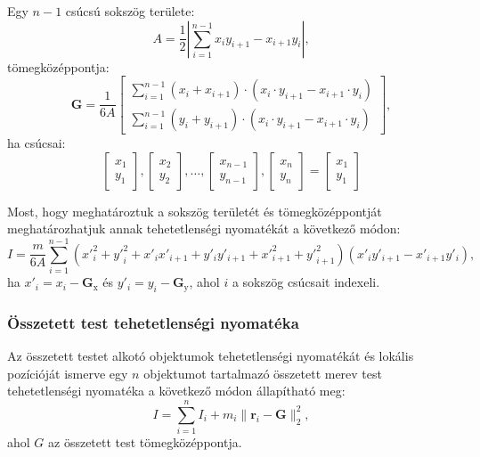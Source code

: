 \documentclass[12pt]{report}
\begin{document}
Egy $n - 1$ csúcsú sokszög területe:
\[
    A = \frac{1}{2} \left|\sum_{i = 1}^{n - 1} x_i y_{i + 1} - x_{i + 1} y_i\right|, \tag{1} \label{eq:shoelace}
\]
tömegközéppontja:
\[
    \mathbf{G} = \frac{1}{6A}
    \begin{bmatrix}
        \sum_{i = 1}^{n - 1} (x_i + x_{i + 1}) \cdot (x_i \cdot y_{i + 1} - x_{i + 1} \cdot y_i) \\
        \sum_{i = 1}^{n - 1} (y_i + y_{i + 1}) \cdot (x_i \cdot y_{i + 1} - x_{i + 1} \cdot y_i)
    \end{bmatrix},
\]
ha csúcsai:
\[
    \begin{bmatrix}
        x_1 \\
        y_1
    \end{bmatrix},
    \begin{bmatrix}
        x_2 \\
        y_2
    \end{bmatrix},
    \dots,
    \begin{bmatrix}
        x_{n - 1} \\
        y_{n - 1}
    \end{bmatrix},
    \begin{bmatrix}
        x_n \\
        y_n
    \end{bmatrix}=
    \begin{bmatrix}
        x_1 \\
        y_1
    \end{bmatrix}
\]

Most, hogy meghatároztuk a sokszög területét és tömegközéppontját meghatározhatjuk annak tehetetlenségi nyomatékát a következő módon:
\[
    I = \frac{m}{6A} \sum_{i = 1}^{n - 1} ({x'}_i^2 + {y'}_i^2 + x'_i x'_{i + 1} + y'_i y'_{i + 1} + {x'}_{i + 1}^2 + {y'}_{i + 1}^2)(x'_i y'_{i + 1} - x'_{i + 1} y'_i),
\]
ha $x'_i = x_i - \mathbf{G}_{\text{x}}$ és $y'_i = y_i - \mathbf{G}_{\text{y}}$, ahol $i$ a sokszög csúcsait indexeli.

\subsubsection{Összetett test tehetetlenségi nyomatéka}

Az összetett testet alkotó objektumok tehetetlenségi nyomatékát és lokális pozícióját ismerve egy $n$ objektumot tartalmazó összetett merev test tehetetlenségi nyomatéka a következő módon állapítható meg:
\[
    I = \sum_{i = 1}^{n} I_i + m_i \|\mathbf{r}_i - \mathbf{G}\|_2^2,
\]
ahol $G$ az összetett test tömegközéppontja.
\end{document}
